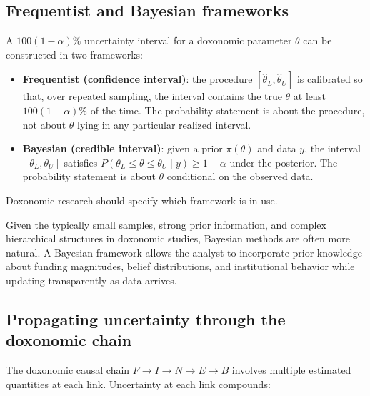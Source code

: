 \subsection{Frequentist and Bayesian frameworks}

\begin{definition}
\label{def:uncertainty-interval}
A $100(1-\alpha)\%$ uncertainty interval for a doxonomic parameter $\theta$ can be constructed in two frameworks:
\begin{itemize}[nosep]
  \item \textbf{Frequentist (confidence interval)}: the procedure $[\hat{\theta}_L, \hat{\theta}_U]$ is calibrated so that, over repeated sampling, the interval contains the true $\theta$ at least $100(1-\alpha)\%$ of the time.
  The probability statement is about the procedure, not about $\theta$ lying in any particular realized interval.
  \item \textbf{Bayesian (credible interval)}: given a prior $\pi(\theta)$ and data $y$, the interval $[\theta_L, \theta_U]$ satisfies $P(\theta_L \leq \theta \leq \theta_U \mid y) \geq 1 - \alpha$ under the posterior.
  The probability statement is about $\theta$ conditional on the observed data.
\end{itemize}
Doxonomic research should specify which framework is in use.
\end{definition}

Given the typically small samples, strong prior information, and complex hierarchical structures in doxonomic studies, Bayesian methods are often more natural.
A Bayesian framework allows the analyst to incorporate prior knowledge about funding magnitudes, belief distributions, and institutional behavior while updating transparently as data arrives.

\subsection{Propagating uncertainty through the doxonomic chain}

The doxonomic causal chain $F \to I \to N \to E \to B$ involves multiple estimated quantities at each link.
Uncertainty at each link compounds:

